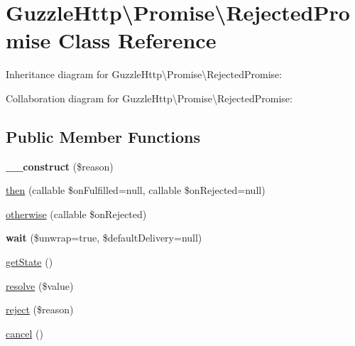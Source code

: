 \hypertarget{classGuzzleHttp_1_1Promise_1_1RejectedPromise}{}\section{Guzzle\+Http\textbackslash{}Promise\textbackslash{}Rejected\+Promise Class Reference}
\label{classGuzzleHttp_1_1Promise_1_1RejectedPromise}


Inheritance diagram for Guzzle\+Http\textbackslash{}Promise\textbackslash{}Rejected\+Promise\+:


Collaboration diagram for Guzzle\+Http\textbackslash{}Promise\textbackslash{}Rejected\+Promise\+:
\subsection*{Public Member Functions}
\begin{DoxyCompactItemize}
\item 
\mbox{\label{classGuzzleHttp_1_1Promise_1_1RejectedPromise_aa245457845016b1057788faf634c8537}} 
{\bfseries \+\_\+\+\_\+construct} (\$reason)
\item 
\hyperlink{classGuzzleHttp_1_1Promise_1_1RejectedPromise_a2b91783cd3388e3aa66d0902c3cf4c49}{then} (callable \$on\+Fulfilled=null, callable \$on\+Rejected=null)
\item 
\hyperlink{classGuzzleHttp_1_1Promise_1_1RejectedPromise_a83b4819e3244c3f0ee82c636b54bb99c}{otherwise} (callable \$on\+Rejected)
\item 
\mbox{\label{classGuzzleHttp_1_1Promise_1_1RejectedPromise_a31f4f437ae073fd64b003f25ccb44eb9}} 
{\bfseries wait} (\$unwrap=true, \$default\+Delivery=null)
\item 
\hyperlink{classGuzzleHttp_1_1Promise_1_1RejectedPromise_a335b97e19692bbbba3718d892d335dd9}{get\+State} ()
\item 
\hyperlink{classGuzzleHttp_1_1Promise_1_1RejectedPromise_a7ae165802820c8c9afa1d4d2697c3c58}{resolve} (\$value)
\item 
\hyperlink{classGuzzleHttp_1_1Promise_1_1RejectedPromise_a6890810c39d795507fef5d8be1a4d60d}{reject} (\$reason)
\item 
\hyperlink{classGuzzleHttp_1_1Promise_1_1RejectedPromise_a57da0985dd2da478314844a4a1b7d781}{cancel} ()
\end{DoxyCompactItemize}

